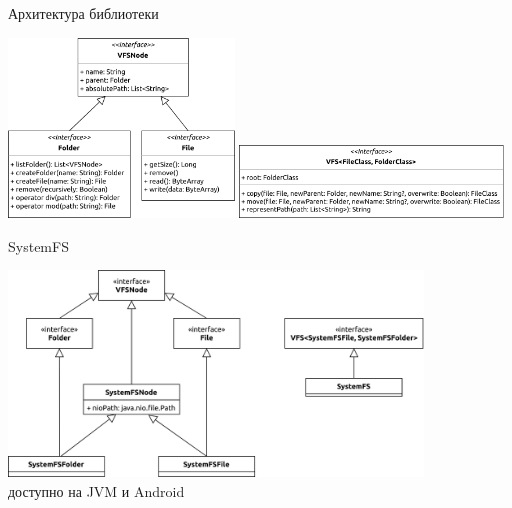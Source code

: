 \documentclass[14pt,aspectratio=169,hyperref={pdftex,unicode},xcolor=dvipsnames]{beamer}
\begin{document}
\begin{frame}{Архитектура библиотеки}
\begin{center}
\includegraphics[width=6cm,keepaspectratio]{vfsnode-folder-file}
\hspace{0.2cm}
\includegraphics[width=7cm,keepaspectratio]{vfs}
\end{center}
\end{frame}

\begin{frame}{SystemFS}
\begin{center}
\includegraphics[width=11cm,keepaspectratio]{systemfs-detailed}\\
\small доступно на JVM и Android
\end{center}
\end{frame}
\end{document}
